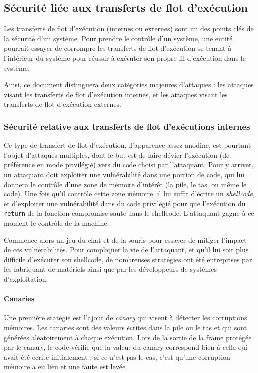 		\subsection{Sécurité liée aux transferts de flot d'exécution}

		Les transferts de flot d'exécution (internes ou externes) sont un des points clés de la sécurité d'un système. Pour prendre le contrôle d'un système, une entité pourrait essayer de corrompre les transferts de flot d'exécution se tenant à l'intérieur du système pour réussir à exécuter son propre fil d'exécution dans le système.

		Ainsi, ce document distinguera deux catégories majeures d'attaques : les attaques visant les transferts de flot d'exécution internes, et les attaques visant les transferts de flot d'exécution externes.

		\subsubsection{Sécurité relative aux transferts de flot d'exécutions internes}
Ce type de transfert de flot d'exécution, d'apparence assez anodine, est pourtant l'objet d'attaques multiples, dont le but est de faire dévier l'exécution (de préférence en mode privilégié) vers du code choisi par l'attaquant. Pour y arriver, un attaquant doit exploiter une vulnérabilité dans une portion de code, qui lui donnera le contrôle d'une zone de mémoire d'intérêt (la pile, le tas, ou même le code). Une fois qu'il contrôle cette zone mémoire, il lui suffit d'écrire un \emph{shellcode}, et d'exploiter une vulnérabilité dans du code privilégié pour que l'exécution du \texttt{return} de la fonction compromise saute dans le shellcode. L'attaquant gagne à ce moment le contrôle de la machine.

Commence alors un jeu du chat et de la souris pour essayer de mitiger l'impact de ces vulnérabilités. Pour compliquer la vie de l'attaquant, et qu'il lui soit plus difficile d'exécuter son shellcode, de nombreuses stratégies ont été entreprises par les fabriquant de matériels ainsi que par les développeurs de systèmes d'exploitation. 

\paragraph{Canaries}
Une première statégie est l'ajout de \emph{canary} qui visent à détecter les corruptions mémoires. Les canaries sont des valeurs écrites dans la pile ou le tas et qui sont générées aléatoirement à chaque exécution. Lors de la sortie de la frame protégée par le canary, le code vérifie que la valeur du canary correspond bien à celle qui avait été écrite initialement ; si ce n'est pas le cas, c'est qu'une corruption mémoire a eu lieu et une faute est levée.


